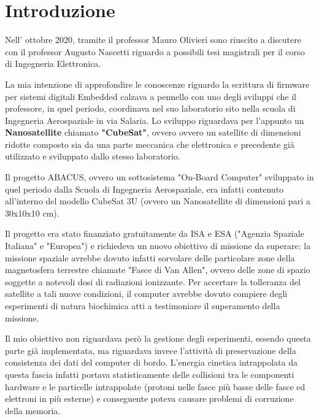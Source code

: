 \documentclass[LaM,binding=0.6cm,oneside]{../sapthesis}
\begin{document}
\tableofcontents

\listoffigures

\listoftables

\chapter{Introduzione}
Nell' ottobre 2020, tramite il professor Mauro Olivieri sono riuscito a discutere con il professor Augusto Nascetti riguardo a possibili tesi magistrali per il corso di Ingegneria Elettronica. 

La mia intenzione di approfondire le conoscenze riguardo la scrittura di firmware per sistemi digitali Embedded calzava a pennello con uno degli sviluppi che il professore, in quel periodo, coordinava nel suo laboratorio sito nella scuola di Ingegneria Aerospaziale in via Salaria. Lo sviluppo riguardava per l'appunto un \textbf{Nanosatellite} chiamato \textbf{"CubeSat"}, ovvero ovvero un satellite di dimensioni ridotte composto sia da una parte meccanica che elettronica e precedente già utilizzato e sviluppato dallo stesso laboratorio. 

Il progetto ABACUS, ovvero un sottosistema "On-Board Computer" sviluppato in quel periodo dalla Scuola di Ingegneria Aerospaziale, era infatti contenuto all'interno del modello CubeSat 3U (ovvero un Nanosatellite di dimensioni pari a 30x10x10 cm). 

Il progetto era stato finanziato gratuitamente da ISA e ESA ("Agenzia Spaziale Italiana" e "Europea") e richiedeva un nuovo obiettivo di missione da superare: la missione spaziale avrebbe dovuto infatti sorvolare delle particolare zone della magnetosfera terrestre chiamate "Fasce di Van Allen", ovvero delle zone di spazio soggette a notevoli dosi di radiazioni ionizzante. Per accertare la tolleranza del satellite a tali nuove condizioni, il computer avrebbe dovuto compiere degli esperimenti di natura biochimica atti a testimoniare il superamento della missione. 

Il mio obiettivo non riguardava però la gestione degli esperimenti, essendo questa parte già implementata, ma riguardava invece l'attività di preservazione della consistenza dei dati del computer di bordo. L'energia cinetica intrappolata da questa fascia infatti portava statisticamente delle collisioni tra le componenti hardware e le particelle intrappolate (protoni nelle fasce più basse delle fasce ed elettroni in più esterne) e conseguente poteva causare problemi di corruzione della memoria. 
\end{document}
